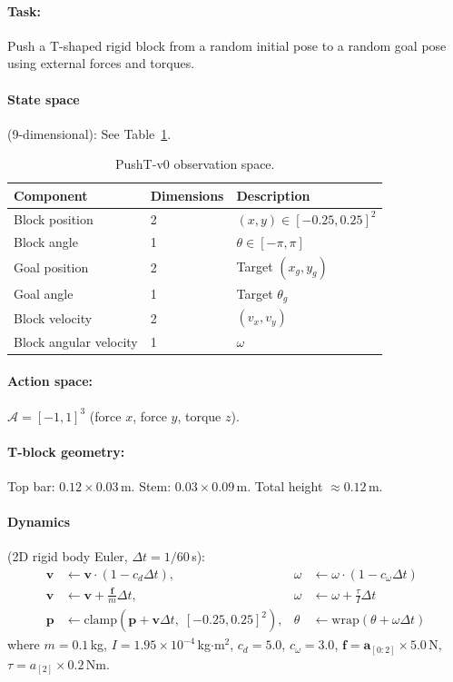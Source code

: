 \documentclass[11pt,a4paper]{article}
\newcommand{\cA}{\mathcal{A}}
\newcommand{\bvf}{\mathbf{v}}
\newcommand{\bpf}{\mathbf{p}}
\newcommand{\bff}{\mathbf{f}}
\newcommand{\ba}{\mathbf{a}}
\begin{document}
\paragraph{Task:} Push a T-shaped rigid block from a random initial pose to a random goal pose using external forces and torques.

\paragraph{State space} (9-dimensional): See Table~\ref{tab:pt_obs}.

\begin{table}[htbp]
  \centering
  \caption{PushT-v0 observation space.}
  \label{tab:pt_obs}
  \begin{tabular}{@{}lll@{}}
    \toprule
    \textbf{Component} & \textbf{Dimensions} & \textbf{Description} \\
    \midrule
    Block position        & 2 & $(x, y) \in [-0.25, 0.25]^2$ \\
    Block angle           & 1 & $\theta \in [-\pi, \pi]$ \\
    Goal position         & 2 & Target $(x_g, y_g)$ \\
    Goal angle            & 1 & Target $\theta_g$ \\
    Block velocity        & 2 & $(v_x, v_y)$ \\
    Block angular velocity & 1 & $\omega$ \\
    \bottomrule
  \end{tabular}
\end{table}

\paragraph{Action space:} $\cA = [-1, 1]^3$ (force $x$, force $y$, torque $z$).

\paragraph{T-block geometry:} Top bar: $0.12 \times 0.03$\,m. Stem: $0.03 \times 0.09$\,m. Total height $\approx 0.12$\,m.

\paragraph{Dynamics} (2D rigid body Euler, $\Delta t = 1/60$\,s):
\begin{align}
  \bvf &\leftarrow \bvf \cdot (1 - c_d \Delta t), & \omega &\leftarrow \omega \cdot (1 - c_\omega \Delta t) \\
  \bvf &\leftarrow \bvf + \frac{\bff}{m} \Delta t,  & \omega &\leftarrow \omega + \frac{\tau}{I} \Delta t \\
  \bpf &\leftarrow \text{clamp}\!\left(\bpf + \bvf \Delta t,\; [-0.25, 0.25]^2\right), & \theta &\leftarrow \text{wrap}(\theta + \omega \Delta t)
\end{align}
where $m = 0.1$\,kg, $I = 1.95 \times 10^{-4}$\,kg$\cdot$m$^2$, $c_d = 5.0$, $c_\omega = 3.0$, $\bff = \ba_{[0:2]} \times 5.0$\,N, $\tau = a_{[2]} \times 0.2$\,Nm.
\end{document}
